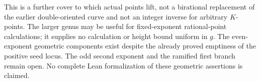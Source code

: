 This is a further cover to which actual points lift, not a birational
replacement of the earlier double-oriented curve and not an integer
inverse for arbitrary $K$-points. The larger genus may be useful for
fixed-exponent rational-point calculations; it supplies no calculation
or height bound uniform in $g$. The even-exponent geometric components
exist despite the already proved emptiness of the positive seed locus.
The odd second exponent and the ramified first branch remain open.
No complete Lean formalization of these geometric assertions is claimed.
